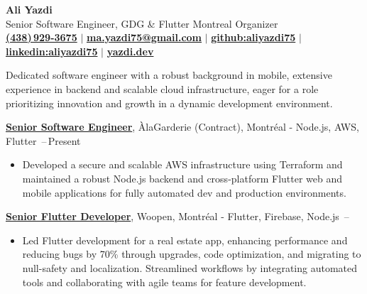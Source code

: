 \documentclass[letterpaper,11pt]{article}
\makeatletter
\newcommand{\CVAuthor}{Ali Yazdi}
\newcommand{\TitleDesciption}{Senior Software Engineer, GDG \& Flutter Montreal Organizer}
\newcommand{\CVWebpageName}{yazdi.dev}
\newcommand{\CVWebpage}{https://yazdi.dev}
\newcommand{\MainEmailName}{ma.yazdi75@gmail.com}
\newcommand{\MainEmail}{mailto:ma.yazdi75@gmail.com}
\newcommand{\LinkedinName}{linkedin:aliyazdi75}
\newcommand{\Linkedin}{https://linkedin.com/in/aliyazdi75}
\newcommand{\GithubName}{github:aliyazdi75}
\newcommand{\Github}{https://github.com/aliyazdi75}
\newcommand{\PhoneName}{(438)\,929-3675}
\newcommand{\Phone}{tel:+14389293675}
\makeatother
\begin{document}

\begin{center}
    \textbf{\Huge \CVAuthor} \\
    \vspace{1mm}
    \TitleDesciption \\
    \small {\txtcolor\href{\Phone}{\textbf{\PhoneName}}}
    $\vert$
    {\txtcolor\href{\MainEmail}{\textbf{\MainEmailName}}}
    $\vert$
    {\txtcolor\href{\Github}{\textbf{\GithubName}}}
    $\vert$
    {\txtcolor\href{\Linkedin}{\textbf{\LinkedinName}}}
    $\vert$
    {\txtcolor\href{\CVWebpage}{\textbf{\CVWebpageName}}}
\end{center}



Dedicated software engineer with a robust background in mobile, extensive experience
in backend and scalable cloud infrastructure, eager for a role prioritizing innovation and growth in a dynamic development environment.



\href{https://alagarderie.ca}
{\textbf{Senior Software Engineer}}, ÀlaGarderie (Contract), Montréal - Node.js, AWS, Flutter
\hfill {}\,--\,Present
\begin{itemize}[leftmargin=*, noitemsep, topsep=0pt, partopsep=0pt]
    \item Developed a secure and scalable AWS infrastructure using Terraform and maintained a robust Node.js backend and cross-platform Flutter web and mobile applications for fully automated dev and production environments.
\end{itemize}

\BigGap
\href{https://woopen.com}
{\textbf{Senior Flutter Developer}}, Woopen, Montréal - Flutter, Firebase, Node.js
\hfill {}\,--\,
\begin{itemize}[leftmargin=*, noitemsep, topsep=0pt, partopsep=0pt]
    \item Led Flutter development for a real estate app, enhancing performance and reducing bugs by 70\% through upgrades, code optimization, and migrating to null-safety and localization. Streamlined workflows by integrating automated tools and collaborating with agile teams for feature development.
\end{itemize}
\end{document}
